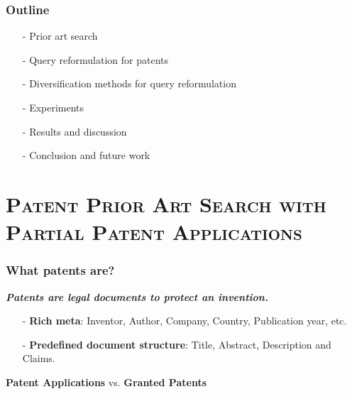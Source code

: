 \documentclass[xcolor=x11names,compress]{beamer}
\renewcommand{\(}{\begin{columns}}
\renewcommand{\)}{\end{columns}}
\newcommand{\<}[1]{\begin{column}{#1}}
\renewcommand{\>}{\end{column}}
\begin{document}


\begin{frame}
\frametitle{Outline}
\begin{itemize}
\item[-] Prior art search
\item[-] Query reformulation for patents
\item[-] Diversification methods for query reformulation
\item[-] Experiments 
\item[-] Results and discussion
\item[-] Conclusion and future work
\end{itemize}
\end{frame}

\section{\scshape Patent Prior Art Search with Partial Patent Applications}

\begin{frame}
\frametitle{What patents are?}

\textit{\textbf{{\color{DeepSkyBlue4}Patents are legal documents to protect an invention.}}}

\begin{itemize}
\item[-] \textbf{Rich meta}: Inventor, Author, Company, Country, Publication year, etc.
\item[-] \textbf{Predefined document structure}: Title, Abstract, Description and Claims.		
\item[]
\end{itemize}

\begin{center}
\textbf{Patent Applications} vs. \textbf{Granted Patents}
\end{center}

\end{frame}
\end{document}
